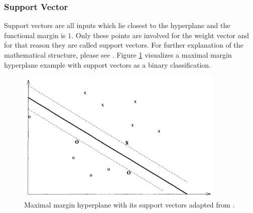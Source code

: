 \subsubsection*{Support Vector}

Support vectors are all inputs which lie closest to the hyperplane and the functional margin is $1$. Only these points are involved for the weight vector and for that reason they are called support vectors. For further explanation of the mathematical structure, please see \cite{cristianini_shawe-taylor_2000}. Figure \ref{fig:sv} visualizes a maximal margin hyperplane example with support vectors as a binary classification.

\begin{figure}[ht!]
  \centering
  \includegraphics[width=10cm]{pictures/support_vectors.png}
  \caption{Maximal margin hyperplane with its support vectors adapted from \cite{cristianini_shawe-taylor_2000}.}
  \label{fig:sv}
\end{figure}
